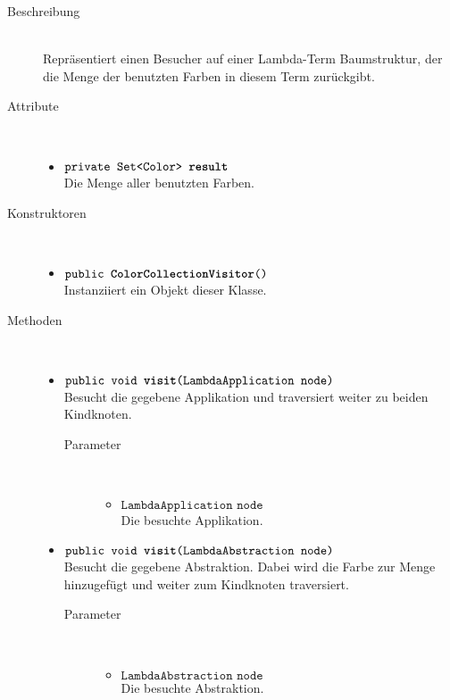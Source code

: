 \begin{description}
\item[Beschreibung] \hfill \\ Repräsentiert einen Besucher auf einer Lambda-Term Baumstruktur, der die Menge der benutzten Farben in diesem Term zurückgibt.

\item[Attribute] \hfill \\
	\vspace{-.8cm}
	\begin{itemize}
		\item $\texttt{private Set<Color> \textbf{result}}$ \\ Die Menge aller benutzten Farben.
	\end{itemize}

\item[Konstruktoren] \hfill \\
	\vspace{-.8cm}
	\begin{itemize}
		\item $\texttt{public \textbf{ColorCollectionVisitor}()}$ \\ Instanziiert ein Objekt dieser Klasse.
	\end{itemize}

\item[Methoden] \hfill \\
	\vspace{-.8cm}
	\begin{itemize}
		\item $\texttt{public void \textbf{visit}(LambdaApplication node)}$ \\ Besucht die gegebene Applikation und traversiert weiter zu beiden Kindknoten.
		\begin{description}
			\item[Parameter] \hfill \\
			\vspace{-.8cm}
			\begin{itemize}
				\item $\texttt{LambdaApplication node}$ \\ Die besuchte Applikation.
			\end{itemize}
		\end{description}
		
		\item $\texttt{public void \textbf{visit}(LambdaAbstraction node)}$ \\ Besucht die gegebene Abstraktion. Dabei wird die Farbe zur Menge hinzugefügt und weiter zum Kindknoten traversiert.
		\begin{description}
			\item[Parameter] \hfill \\
			\vspace{-.8cm}
			\begin{itemize}
				\item $\texttt{LambdaAbstraction node}$ \\ Die besuchte Abstraktion.
			\end{itemize}
		\end{description}
		

\end{itemize}
\end{description}
